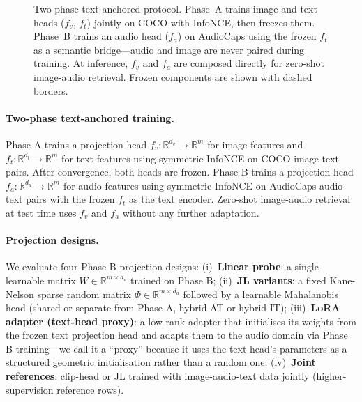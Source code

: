 \documentclass{article}
\newcommand{\R}{\mathbb{R}}
\begin{document}
\begin{figure}[tbp]
{%
  }%
  \caption{Two-phase text-anchored protocol. Phase~A trains image and text heads ($f_v$, $f_t$) jointly
  on COCO with InfoNCE, then freezes them. Phase~B trains an audio head ($f_a$) on AudioCaps using the
  frozen $f_t$ as a semantic bridge---audio and image are never paired during training.
  At inference, $f_v$ and $f_a$ are composed directly for zero-shot image-audio retrieval.
  Frozen components are shown with dashed borders.}
  \label{fig:architecture}
\end{figure}

\paragraph{Two-phase text-anchored training.}
Phase A trains a projection head $f_v\colon \R^{d_v} \to \R^m$ for image features and $f_t\colon \R^{d_t} \to \R^m$ for text features using symmetric InfoNCE on COCO image-text pairs.
After convergence, both heads are frozen.
Phase B trains a projection head $f_a\colon \R^{d_a} \to \R^m$ for audio features using symmetric InfoNCE on AudioCaps audio-text pairs with the frozen $f_t$ as the text encoder.
Zero-shot image-audio retrieval at test time uses $f_v$ and $f_a$ without any further adaptation.

\paragraph{Projection designs.}
We evaluate four Phase B projection designs:
(i)~\textbf{Linear probe}: a single learnable matrix $W \in \R^{m \times d_a}$ trained on Phase B;
(ii)~\textbf{JL variants}: a fixed Kane-Nelson sparse random matrix $\Phi \in \R^{m \times d_a}$ \citep{kane2014sparser} followed by a learnable Mahalanobis head (shared or separate from Phase A, hybrid-AT or hybrid-IT);
(iii)~\textbf{LoRA adapter (text-head proxy)}: a low-rank adapter that initialises its weights from the frozen text projection head and adapts them to the audio domain via Phase B training---we call it a ``proxy'' because it uses the text head's parameters as a structured geometric initialisation rather than a random one;
(iv)~\textbf{Joint references}: clip-head or JL trained with image-audio-text data jointly (higher-supervision reference rows).
\end{document}

